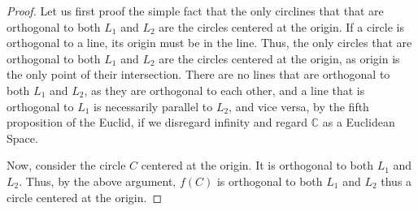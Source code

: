 \documentclass[12pt, a4paper]{article}
\theoremstyle{definition}
\theoremstyle{remark}
\newcommand{\bb}[1]{\mathbb{#1}}
\begin{document}
\begin{proof}
	Let us first proof the simple fact that the only circlines that that are orthogonal to both $L_1$ and $L_2$ are the circles centered at the origin.
	If a circle is orthogonal to a line, its origin must be in the line.
	Thus, the only circles that are orthogonal to both $L_1$ and $L_2$ are the circles centered at the origin, as origin is the only point of their intersection.
	There are no lines that are orthogonal to both $L_1$ and $L_2$, as they are orthogonal to each other, and a line that is orthogonal to $L_1$ is necessarily parallel to $L_2$, and vice versa, by the fifth proposition of the Euclid, if we disregard infinity and regard $\bb{C}$ as a Euclidean Space.

	Now, consider the circle $C$ centered at the origin. It is orthogonal to both $L_1$ and $L_2$. Thus, by the above argument, $f(C)$ is orthogonal to both $L_1$ and $L_2$ thus a circle centered at the origin.
\end{proof}
\end{document}
